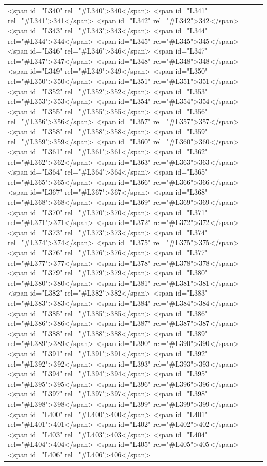 \documentclass[a4paper,11pt,french]{article}
\begin{document}
\begin{tabular}{|m{8cm}|m{8cm}|}
<span id="L340" rel="#L340">340</span>
<span id="L341" rel="#L341">341</span>
<span id="L342" rel="#L342">342</span>
<span id="L343" rel="#L343">343</span>
<span id="L344" rel="#L344">344</span>
<span id="L345" rel="#L345">345</span>
<span id="L346" rel="#L346">346</span>
<span id="L347" rel="#L347">347</span>
<span id="L348" rel="#L348">348</span>
<span id="L349" rel="#L349">349</span>
<span id="L350" rel="#L350">350</span>
<span id="L351" rel="#L351">351</span>
<span id="L352" rel="#L352">352</span>
<span id="L353" rel="#L353">353</span>
<span id="L354" rel="#L354">354</span>
<span id="L355" rel="#L355">355</span>
<span id="L356" rel="#L356">356</span>
<span id="L357" rel="#L357">357</span>
<span id="L358" rel="#L358">358</span>
<span id="L359" rel="#L359">359</span>
<span id="L360" rel="#L360">360</span>
<span id="L361" rel="#L361">361</span>
<span id="L362" rel="#L362">362</span>
<span id="L363" rel="#L363">363</span>
<span id="L364" rel="#L364">364</span>
<span id="L365" rel="#L365">365</span>
<span id="L366" rel="#L366">366</span>
<span id="L367" rel="#L367">367</span>
<span id="L368" rel="#L368">368</span>
<span id="L369" rel="#L369">369</span>
<span id="L370" rel="#L370">370</span>
<span id="L371" rel="#L371">371</span>
<span id="L372" rel="#L372">372</span>
<span id="L373" rel="#L373">373</span>
<span id="L374" rel="#L374">374</span>
<span id="L375" rel="#L375">375</span>
<span id="L376" rel="#L376">376</span>
<span id="L377" rel="#L377">377</span>
<span id="L378" rel="#L378">378</span>
<span id="L379" rel="#L379">379</span>
<span id="L380" rel="#L380">380</span>
<span id="L381" rel="#L381">381</span>
<span id="L382" rel="#L382">382</span>
<span id="L383" rel="#L383">383</span>
<span id="L384" rel="#L384">384</span>
<span id="L385" rel="#L385">385</span>
<span id="L386" rel="#L386">386</span>
<span id="L387" rel="#L387">387</span>
<span id="L388" rel="#L388">388</span>
<span id="L389" rel="#L389">389</span>
<span id="L390" rel="#L390">390</span>
<span id="L391" rel="#L391">391</span>
<span id="L392" rel="#L392">392</span>
<span id="L393" rel="#L393">393</span>
<span id="L394" rel="#L394">394</span>
<span id="L395" rel="#L395">395</span>
<span id="L396" rel="#L396">396</span>
<span id="L397" rel="#L397">397</span>
<span id="L398" rel="#L398">398</span>
<span id="L399" rel="#L399">399</span>
<span id="L400" rel="#L400">400</span>
<span id="L401" rel="#L401">401</span>
<span id="L402" rel="#L402">402</span>
<span id="L403" rel="#L403">403</span>
<span id="L404" rel="#L404">404</span>
<span id="L405" rel="#L405">405</span>
<span id="L406" rel="#L406">406</span>

\end{tabular}
\end{document}
